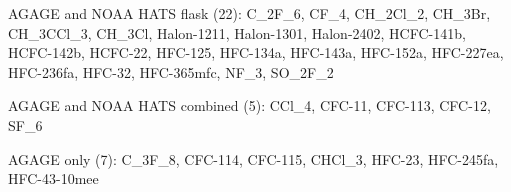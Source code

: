     \item AGAGE and NOAA HATS flask (22): C_2F_6, CF_4, CH_2Cl_2, CH_3Br, CH_3CCl_3, CH_3Cl, Halon-1211, Halon-1301, Halon-2402, HCFC-141b, HCFC-142b, HCFC-22, HFC-125, HFC-134a, HFC-143a, HFC-152a, HFC-227ea, HFC-236fa, HFC-32, HFC-365mfc, NF_3, SO_2F_2
    \item AGAGE and NOAA HATS combined (5): CCl_4, CFC-11, CFC-113, CFC-12, SF_6
    \item AGAGE only (7): C_3F_8, CFC-114, CFC-115, CHCl_3, HFC-23, HFC-245fa, HFC-43-10mee
